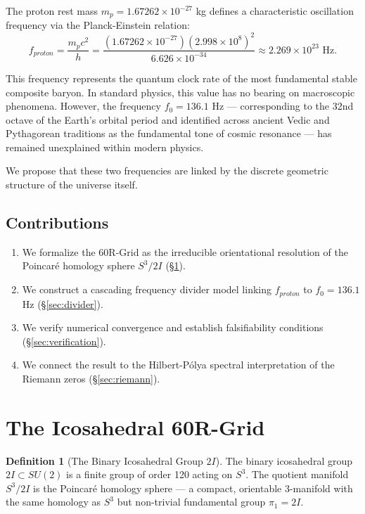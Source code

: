 \documentclass[12pt, a4paper]{article}
\theoremstyle{plain}
\theoremstyle{definition}
\newtheorem{definition}[theorem]{Definition}
\begin{document}
The proton rest mass $m_p = 1.67262 \times 10^{-27}$ kg defines a characteristic oscillation frequency via the Planck-Einstein relation:
\begin{equation}\label{eq:compton_freq}
    f_{proton} = \frac{m_p c^2}{h} = \frac{(1.67262 \times 10^{-27})(2.998 \times 10^8)^2}{6.626 \times 10^{-34}} \approx 2.269 \times 10^{23} \text{ Hz}.
\end{equation}

This frequency represents the quantum clock rate of the most fundamental stable composite baryon. In standard physics, this value has no bearing on macroscopic phenomena. However, the frequency $f_0 = 136.1$ Hz --- corresponding to the 32nd octave of the Earth's orbital period \citep{Cousto1978} and identified across ancient Vedic and Pythagorean traditions as the fundamental tone of cosmic resonance --- has remained unexplained within modern physics.

We propose that these two frequencies are linked by the discrete geometric structure of the universe itself.

\subsection{Contributions}
\begin{enumerate}
    \item We formalize the 60R-Grid as the irreducible orientational resolution of the Poincar\'{e} homology sphere $S^3/2I$ (\S\ref{sec:grid}).
    \item We construct a cascading frequency divider model linking $f_{proton}$ to $f_0 = 136.1$ Hz (\S\ref{sec:divider}).
    \item We verify numerical convergence and establish falsifiability conditions (\S\ref{sec:verification}).
    \item We connect the result to the Hilbert-P\'{o}lya spectral interpretation of the Riemann zeros (\S\ref{sec:riemann}).
\end{enumerate}

\section{The Icosahedral 60R-Grid}\label{sec:grid}

\begin{definition}[The Binary Icosahedral Group $2I$]
The binary icosahedral group $2I \subset SU(2)$ is a finite group of order 120 acting on $S^3$. The quotient manifold $S^3 / 2I$ is the Poincar\'{e} homology sphere --- a compact, orientable 3-manifold with the same homology as $S^3$ but non-trivial fundamental group $\pi_1 = 2I$.
\end{definition}
\end{document}

